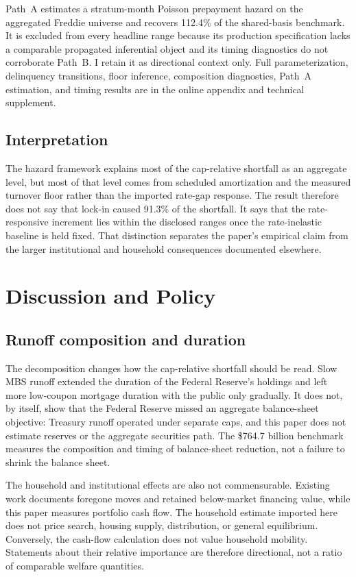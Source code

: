 \documentclass[12pt]{article}
\begin{document}
\label{sec:patha}Path~A estimates a stratum-month Poisson prepayment hazard on the aggregated
Freddie universe and recovers 112.4\% of the shared-basis benchmark. It is
excluded from every headline range because its production specification lacks a
comparable propagated inferential object and its timing diagnostics do not
corroborate Path~B. I retain it as directional context only. Full
parameterization, delinquency transitions, floor inference, composition
diagnostics, Path~A estimation, and timing results are in the online appendix
and technical supplement.

\subsection{Interpretation}\label{sec:hazard-interp}

The hazard framework explains most of the cap-relative shortfall as an aggregate
level, but most of that level comes from scheduled amortization and the measured
turnover floor rather than the imported rate-gap response. The result therefore
does not say that lock-in caused 91.3\% of the shortfall. It says that the
rate-responsive increment lies within the disclosed ranges once the
rate-inelastic baseline is held fixed. That distinction separates the paper's
empirical claim from the larger institutional and household consequences
documented elsewhere.

\section{Discussion and Policy}\label{sec:discussion}
\subsection{Runoff composition and duration}\label{sec:discussion-fallout}

The decomposition changes how the cap-relative shortfall should be read. Slow
MBS runoff extended the duration of the Federal Reserve's holdings and left
more low-coupon mortgage duration with the public only gradually. It does not,
by itself, show that the Federal Reserve missed an aggregate balance-sheet
objective: Treasury runoff operated under separate caps, and this paper does
not estimate reserves or the aggregate securities path. The \$764.7 billion
benchmark measures the composition and timing of balance-sheet reduction, not a
failure to shrink the balance sheet.

The household and institutional effects are also not commensurable. Existing
work documents foregone moves and retained below-market financing value, while
this paper measures portfolio cash flow. The household estimate imported here
does not price search, housing supply, distribution, or general equilibrium.
Conversely, the cash-flow calculation does not value household mobility.
Statements about their relative importance are therefore directional, not a
ratio of comparable welfare quantities.
\end{document}
